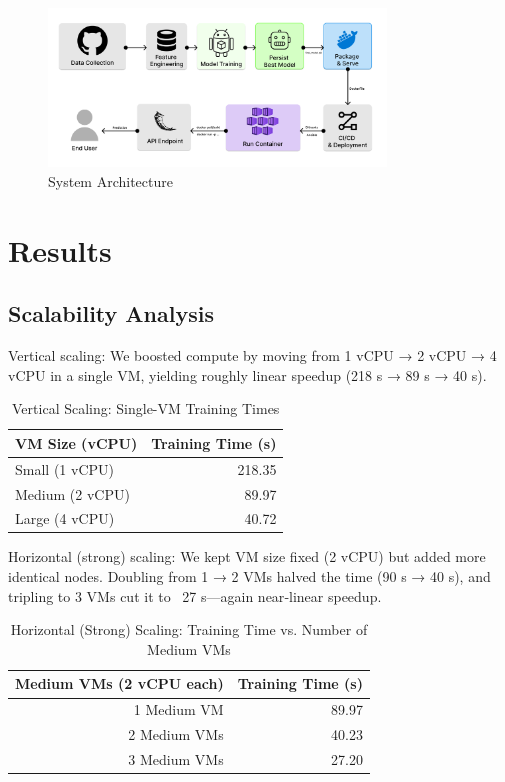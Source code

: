 \documentclass[12pt,a4paper]{article}
\begin{document}
\begin{figure}[H]
  \centering
  \includegraphics[width=0.8\textwidth]{Architecture.png}
  \caption{System Architecture}
  \label{fig:my-image}
\end{figure}

\section{Results}
\subsection{Scalability Analysis}
Vertical scaling: We boosted compute by moving from 1 vCPU → 2 vCPU → 4 vCPU in a single VM, yielding roughly linear speedup (218 s → 89 s → 40 s).
\begin{table}[ht]
  \centering
  \caption{Vertical Scaling: Single-VM Training Times}
  \label{tab:vertical_scaling}
  \begin{tabular}{l r}
    \toprule
    \textbf{VM Size (vCPU)} & \textbf{Training Time (s)} \\
    \midrule
    Small (1 vCPU)   & 218.35 \\
    Medium (2 vCPU)  &  89.97 \\
    Large (4 vCPU)   &  40.72 \\
    \bottomrule
  \end{tabular}
\end{table}

Horizontal (strong) scaling: We kept VM size fixed (2 vCPU) but added more identical nodes. Doubling from 1 → 2 VMs halved the time (90 s → 40 s), and tripling to 3 VMs cut it to ~27 s—again near‐linear speedup.

\begin{table}[ht]
  \centering
  \caption{Horizontal (Strong) Scaling: Training Time vs. Number of Medium VMs}
  \label{tab:horizontal_scaling}
  \begin{tabular}{r r}
    \toprule
     \textbf{Medium VMs (2 vCPU each)} & \textbf{Training Time (s)} \\
    \midrule
    1 Medium VM & 89.97 \\
    2 Medium VMs & 40.23 \\
    3 Medium VMs & 27.20 \\
    \bottomrule
  \end{tabular}
\end{table}
\end{document}
